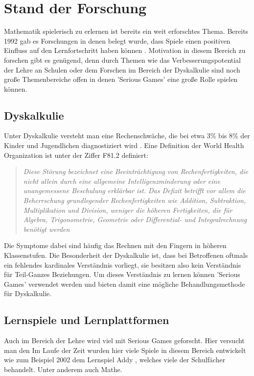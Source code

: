 
\chapter{Stand der Forschung}
Mathematik spielerisch zu erlernen ist bereits ein weit erforschtes Thema. Bereits 1992 gab es Forschungen in denen belegt wurde, dass Spiele einen positiven Einfluss auf den Lernfortschritt haben können \cite{?}. Motivation in diesem Bereich zu forschen gibt es genügend, denn durch Themen wie das Verbesserungspotential der Lehre an Schulen \cite{?} oder dem Forschen im Bereich der Dyskalkulie \cite{?} sind noch große Themenbereiche offen in denen 'Serious Games' eine große Rolle spielen können.
\section{Dyskalkulie}
Unter Dyskalkulie versteht man eine Rechenschwäche, die bei etwa 3\% bis 8\% der Kinder und Jugendlichen diagnostiziert wird \cite{BundesMinisteriumDia}. Eine Definition der World Health Organization ist unter der Ziffer F81.2 definiert:
\begin{quote}
\textit{ Diese Störung bezeichnet eine Beeinträchtigung von Rechenfertigkeiten, die nicht allein durch eine allgemeine Intelligenzminderung oder eine unangemessene Beschulung erklärbar ist. Das Defizit betrifft vor allem die Beherrschung grundlegender Rechenfertigkeiten wie Addition, Subtraktion, Multiplikation und Division, weniger die höheren Fertigkeiten, die für Algebra, Trigonometrie, Geometrie oder Differential- und Integralrechnung benötigt werden }
\end{quote}

Die Symptome dabei sind häufig das Rechnen mit den Fingern in höheren Klassenstufen. Die Besonderheit der Dyskalkulie ist, dass bei Betroffenen oftmals ein fehlendes kardinales Verständnis vorliegt\cite{fritz2009}, sie besitzen also kein Verständnis für Teil-Ganzes Beziehungen. Um dieses Verständnis zu lernen können 'Serious Games' verwendet werden\cite{bachelorarbeit} und bieten damit eine mögliche Behandlungsmethode für Dyskalkulie.
\section{Lernspiele und Lernplattformen}
Auch im Bereich der Lehre wird viel mit Serious Games geforscht.  Hier versucht man den 
Im Laufe der Zeit wurden hier viele Spiele in diesem Bereich entwickelt wie zum Beispiel 2002 dem Lernspiel Addy \cite{?}, welches viele der Schulfächer behandelt. Unter anderem auch Mathe.


